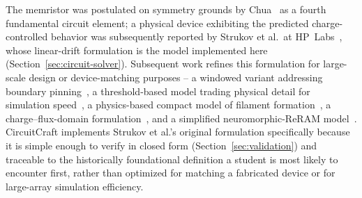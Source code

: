 The memristor was postulated on symmetry grounds by Chua~\cite{chua1971memristor} as a
fourth fundamental circuit element; a physical device exhibiting the predicted
charge-controlled behavior was subsequently reported by Strukov et al.\ at
HP~Labs~\cite{strukov2008missing}, whose linear-drift formulation is the model implemented
here (Section~\ref{sec:circuit-solver}). Subsequent work refines this formulation for
large-scale design or device-matching purposes -- a windowed variant addressing boundary
pinning~\cite{biolek2009spice}, a threshold-based model trading physical detail for
simulation speed~\cite{kvatinsky2013team}, a physics-based compact model of filament
formation~\cite{guan2012compact}, a charge--flux-domain formulation~\cite{picos2015chargeflux},
and a simplified neuromorphic-ReRAM model~\cite{alchawa2020simple}. CircuitCraft implements
Strukov et al.'s original formulation specifically because it is simple enough to verify in
closed form (Section~\ref{sec:validation}) and traceable to the historically foundational
definition a student is most likely to encounter first, rather than optimized for matching a
fabricated device or for large-array simulation efficiency.
